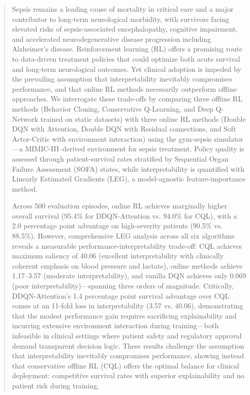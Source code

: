 \documentclass[11pt]{article}
\begin{document}
\bigskip
\begin{abstract}
Sepsis remains a leading cause of mortality in critical care and a major contributor to long-term neurological morbidity, with survivors facing elevated risks of sepsis-associated encephalopathy, cognitive impairment, and accelerated neurodegenerative disease progression including Alzheimer's disease. Reinforcement learning (RL) offers a promising route to data-driven treatment policies that could optimize both acute survival and long-term neurological outcomes. Yet clinical adoption is impeded by the prevailing assumption that interpretability inevitably compromises performance, and that online RL methods necessarily outperform offline approaches. We interrogate these trade-offs by comparing three offline RL methods (Behavior Cloning, Conservative Q-Learning, and Deep Q-Network trained on static datasets) with three online RL methods (Double DQN with Attention, Double DQN with Residual connections, and Soft Actor-Critic with environment interaction) using the gym-sepsis simulator—a MIMIC-III–derived environment for sepsis treatment. Policy quality is assessed through patient-survival rates stratified by Sequential Organ Failure Assessment (SOFA) states, while interpretability is quantified with Linearly Estimated Gradients (LEG), a model-agnostic feature-importance method.

Across 500 evaluation episodes, online RL achieves marginally higher overall survival (95.4\% for DDQN-Attention vs. 94.0\% for CQL), with a 2.0 percentage point advantage on high-severity patients (90.5\% vs. 88.5\%). However, comprehensive LEG analysis across all six algorithms reveals a measurable performance-interpretability trade-off: CQL achieves maximum saliency of 40.06 (excellent interpretability with clinically coherent emphasis on blood pressure and lactate), online methods achieve 1.17--3.57 (moderate interpretability), and vanilla DQN achieves only 0.069 (poor interpretability)—spanning three orders of magnitude. Critically, DDQN-Attention's 1.4 percentage point survival advantage over CQL comes at an 11-fold loss in interpretability (3.57 vs. 40.06), demonstrating that the modest performance gain requires sacrificing explainability and incurring extensive environment interaction during training—both infeasible in clinical settings where patient safety and regulatory approval demand transparent decision logic. These results challenge the assumption that interpretability inevitably compromises performance, showing instead that conservative offline RL (CQL) offers the optimal balance for clinical deployment: competitive survival rates with superior explainability and no patient risk during training.
\end{abstract}
\end{document}
